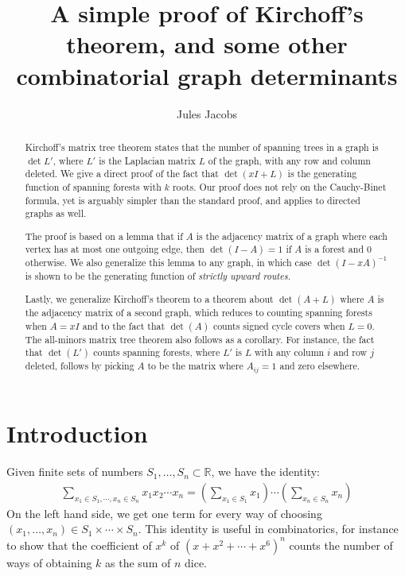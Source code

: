 \documentclass[a4paper, 11pt]{article}
\title{A simple proof of Kirchoff's theorem, and some other combinatorial graph determinants}
\author{Jules Jacobs}
\newcommand{\R}{\mathbb{R}}
\theoremstyle{definition}
\begin{document}
\maketitle

\begin{abstract}
  Kirchoff's matrix tree theorem states that the number of spanning trees in a graph is $\det L'$, where $L'$ is the Laplacian matrix $L$ of the graph, with any row and column deleted. We give a direct proof of the fact that $\det(xI + L)$ is the generating function of spanning forests with $k$ roots. Our proof does not rely on the Cauchy-Binet formula, yet is arguably simpler than the standard proof, and applies to directed graphs as well.

  The proof is based on a lemma that if $A$ is the adjacency matrix of a graph where each vertex has at most one outgoing edge, then $\det(I - A) = 1$ if $A$ is a forest and $0$ otherwise. We also generalize this lemma to any graph, in which case $\det(I-xA)^{-1}$ is shown to be the generating function of \emph{strictly upward routes}.

  Lastly, we generalize Kirchoff's theorem to a theorem about $\det(A + L)$ where $A$ is the adjacency matrix of a second graph, which reduces to counting spanning forests when $A = xI$ and to the fact that $\det(A)$ counts signed cycle covers when $L = 0$. The all-minors matrix tree theorem also follows as a corollary. For instance, the fact that $\det(L')$ counts spanning forests, where $L'$ is $L$ with any column $i$ and row $j$ deleted, follows by picking $A$ to be the matrix where $A_{ij} = 1$ and zero elsewhere.
\end{abstract}

\section{Introduction}

Given finite sets of numbers $S_1, \dots, S_n \subset \R$, we have the identity:
\begin{align*}
  \sum_{x_1 \in S_1, \cdots, x_n \in S_n} x_1 x_2 \cdots x_n =
  \left( \sum_{x_1 \in S_1} x_1 \right) \cdots \left( \sum_{x_n \in S_n} x_n \right)
\end{align*}
On the left hand side, we get one term for every way of choosing $(x_1,\dots,x_n)\in S_1 \times \cdots \times S_n$. This identity is useful in combinatorics, for instance to show that the coefficient of $x^k$ of $(x + x^2 + \cdots + x^6)^n$ counts the number of ways of obtaining $k$ as the sum of $n$ dice.
\end{document}
